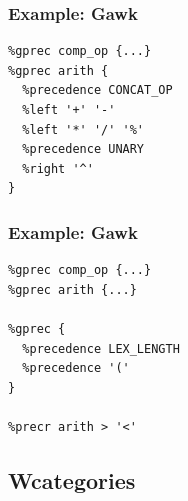 \documentclass{beamer}
\begin{document}
\begin{frame}[fragile]
  \frametitle{Example: Gawk}
\begin{verbatim}
%gprec comp_op {...}
%gprec arith {
  %precedence CONCAT_OP
  %left '+' '-'
  %left '*' '/' '%'
  %precedence UNARY
  %right '^'
}
\end{verbatim}
\end{frame}

\begin{frame}[fragile]
  \frametitle{Example: Gawk}
\begin{verbatim}
%gprec comp_op {...}
%gprec arith {...}

%gprec {
  %precedence LEX_LENGTH
  %precedence '('
}

%precr arith > '<'
\end{verbatim}
\end{frame}

\subsection{Wcategories}
\end{document}
